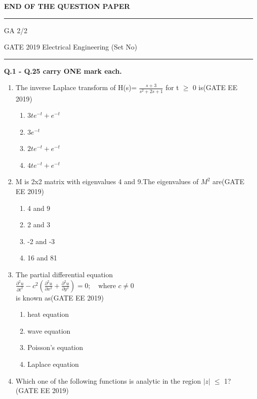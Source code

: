 \documentclass[a4paper,10pt]{exam}
\theoremstyle{remark}
\begin{document}
\begin{enumerate}
\begin{center}
    \textbf{END OF THE QUESTION PAPER}
\end{center}
\vfill
\noindent\rule{\linewidth}{0.4pt}
GA \hfill 2/2
\newpage
\raggedright{GATE 2019 Electrical Engineering (Set No)}

\noindent\rule{\linewidth}{0.4pt}
\textbf{Q.1 - Q.25 carry ONE mark each.}
\begin{enumerate}[label=\arabic*.]
\item The inverse Laplace transform of H(s)= $\frac{s+3}{s^{2}+2s+1}$ for t $\geq
$ 0 is\hfill{(GATE EE 2019)}
\begin{multicols}{2}
\begin{enumerate}
\item $3t e^{-t} + e^{-t}$ 
\item $3e^{-t}$ 
\item $2t e^{-t} + e^{-t}$ 
\item $4te^{-t} + e^{-t}$
\end{enumerate}
\end{multicols}
\item M is 2x2 matrix with eigenvalues 4 and 9.The eigenvalues of $M^{2}$ are\hfill{(GATE EE 2019)}
\begin{multicols}{4}
\begin{enumerate}
\item 4 and 9
\item 2 and 3
\item -2 and -3
\item 16 and 81
\end{enumerate}
\end{multicols}
\item The partial differential equation\\
$\frac{\partial^2 u}{\partial t^2} - c^2 \left( \frac{\partial^2 u}{\partial x^2} + \frac{\partial^2 u}{\partial y^2} \right) = 0 ;\quad \text{where } c \neq 0$ \\
is known as\hfill{(GATE EE 2019)}
\begin{multicols}{2}
\begin{enumerate}
\item heat equation 
\item wave equation
\item Poisson's equation
\item Laplace equation
\end{enumerate}
\end{multicols}
\item Which one of the following functions is analytic in the region $|z| $ $\leq$ 1?\hfill{(GATE EE 2019)}

\end{enumerate}
\end{enumerate}
\end{document}

